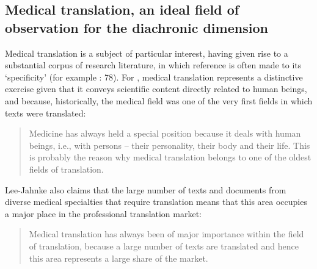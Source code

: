 \documentclass[output=paper]{langscibook}
\begin{document}
\subsection{Medical translation, an ideal field of observation for the diachronic dimension}\label{sec:cuchet:1.1}

Medical translation is a subject of particular interest, having given rise to a substantial corpus of research literature, in which reference is often made to its ‘specificity’ (for example \citealt{Popineau2016}: 78). For \citet{Lee-Jahnke2005}, medical translation represents a distinctive exercise given that it conveys scientific content directly related to human beings, and because, historically, the medical field was one of the very first fields in which texts were translated:
\begin{quote}
Medicine has always held a special position because it deals with human beings, i.e., with persons – their personality, their body and their life. This is probably the reason why medical translation belongs to one of the oldest fields of translation. \citep[81]{Lee-Jahnke2005}
\end{quote}

Lee-Jahnke also claims that the large number of texts and documents from diverse medical specialties that require translation means that this area occupies a major place in the professional translation market:
\begin{quote}
Medical translation has always been of major importance within the field of translation, because a large number of texts are translated and hence this area represents a large share of the market. \citep[81]{Lee-Jahnke2005}
\end{quote}
\end{document}
